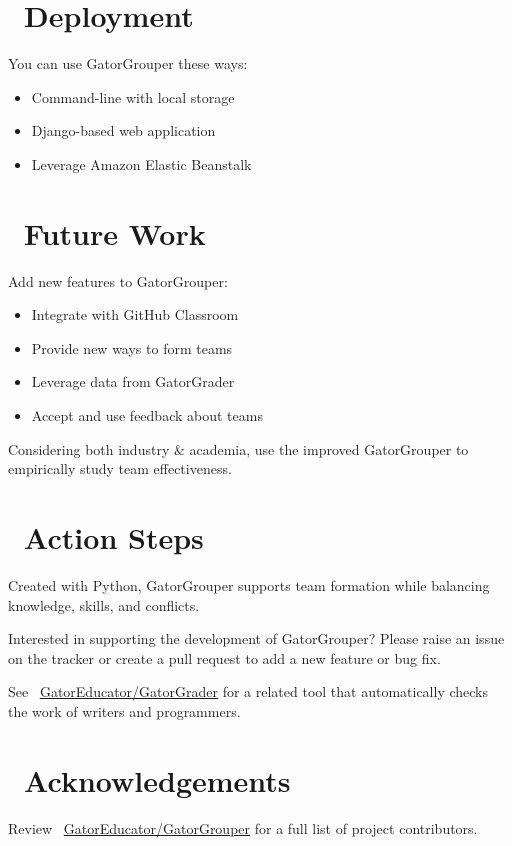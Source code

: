 \documentclass[a0paper,fleqn]{betterposter}
\begin{document}
{\begin{itemize}[leftmargin=*]
  \end{itemize}

  \section{\faCloudUpload~Deployment}
  You can use GatorGrouper these ways:\\
  \vspace*{-.5in}
  \begin{itemize}[leftmargin=*]

    \item{Command-line with local storage}
    \item{Django-based web application}
    \item{Leverage Amazon Elastic Beanstalk}

  \end{itemize}

  \section{\faDashboard~Future Work}
  Add new features to GatorGrouper: \\
  \vspace*{-.5in}

  \begin{itemize}[leftmargin=*]

    \item{Integrate with GitHub Classroom}
    \item{Provide new ways to form teams}
    \item{Leverage data from GatorGrader}
    \item{Accept and use feedback about teams}

  \end{itemize}

  \vspace{.5em}
  Considering both industry \& academia, use the improved GatorGrouper to
  empirically study team effectiveness.

  \section{\faRocket~Action Steps}
  Created with Python, GatorGrouper supports team formation while balancing
  knowledge, skills, and conflicts.

  \vspace*{.25in}
  Interested in supporting the development of GatorGrouper? Please raise an
  issue on the tracker or create a pull request to add a new feature or bug
  fix.

  \vspace*{.25in}
  See \faGithubAlt~\underline{GatorEducator/GatorGrader} for a related tool that
  automatically checks the work of writers and programmers.

  \section{\faThumbsOUp~Acknowledgements}
  Review \faGithubAlt~\underline{GatorEducator/GatorGrouper} for a full list of
  project contributors.

}
\end{document}
